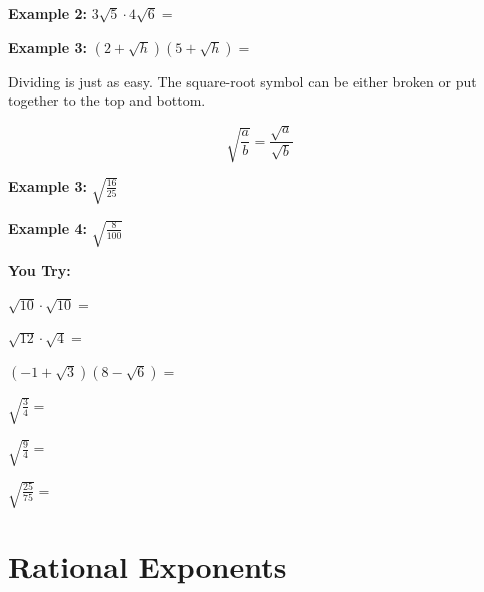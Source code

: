 \documentclass[12pt]{article}
\begin{document}
\textbf{Example 2:} $3\sqrt{5} \cdot 4 \sqrt{6}=$\\

\vspace{1cm}

\textbf{Example 3:} $(2+\sqrt{h})(5+\sqrt{h})=$\\

\vspace{1cm}

\hrulefill

Dividing is just as easy. The square-root symbol can be either broken or put together to the top and bottom.
	
$$\sqrt{\frac{a}{b}}= \frac{\sqrt{a}}{\sqrt{b}}$$

\textbf{Example 3:} $\sqrt{\frac{16}{25}}$

\vspace{1cm}

\textbf{Example 4:} $\sqrt{\frac{8}{100}}$

\vspace{1cm}

\hrulefill
	

\textbf{You Try:}

\begin{enumerate}
\begin{multicols}{2}

	\item $\sqrt{10} \cdot \sqrt{10}=$\\
	
	\item $\sqrt{12} \cdot \sqrt{4}=$\\
	
	\item $(-1 + \sqrt{3})(8 - \sqrt{6})=$\\
	
	\item $\sqrt{\frac{3}{4}}=$\\
	
	\item $\sqrt{\frac{9}{4}}=$\\
	
	\item $\sqrt{\frac{25}{75}}=$\\
\end{multicols}
\end{enumerate} 



\section*{Rational Exponents}
\end{document}
